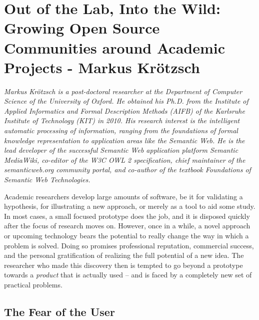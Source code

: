 \chapter{Out of the Lab, Into the Wild: Growing Open Source Communities around
Academic Projects - Markus Kr\"{o}tzsch}

\textit{Markus Kr\"otzsch is a post-doctoral researcher at the Department of
Computer Science of the University of Oxford. He obtained his Ph.D. from the
Institute of Applied Informatics and Formal Description Methods (AIFB) of the
Karlsruhe Institute of Technology (KIT) in 2010. His research interest is the
intelligent automatic processing of information, ranging from the foundations of
formal knowledge representation to application areas like the Semantic Web. He
is the lead developer of the successful Semantic Web application platform
Semantic MediaWiki, co-editor of the W3C OWL 2 specification, chief maintainer
of the semanticweb.org community portal, and co-author of the textbook
Foundations of Semantic Web Technologies.}

Academic researchers develop large amounts of software, be it for validating a
hypothesis, for illustrating a new approach, or merely as a tool to aid some
study. In most cases, a small focused prototype does the job, and it is
disposed quickly after the focus of research moves on. However, once in a while,
a novel approach or upcoming technology bears the potential to really change the
way in which a problem is solved. Doing so promises professional reputation,
commercial success, and the personal gratification of realizing the full
potential of a new idea. The researcher who made this discovery then is tempted
to go beyond a prototype towards a \emph{product} that is actually used -- and
is faced by a completely new set of practical problems.

\section*{The Fear of the User}

